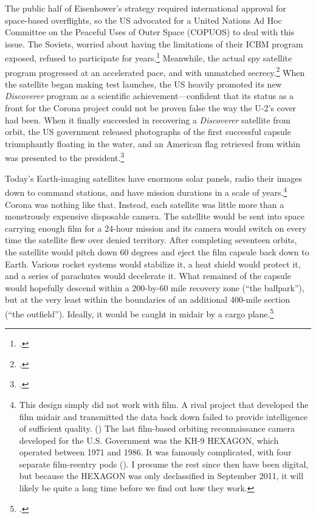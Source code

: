 \documentclass[14pt]{extarticle}
\begin{document}
The public half of Eisenhower's strategy required international approval for space-based overflights, so the US advocated for a United Nations Ad Hoc Committee on the Peaceful Uses of Outer Space (COPUOS) to deal with this issue. The Soviets, worried about having the limitations of their ICBM program exposed, refused to participate for years.\footcite[p.~140]{day_eye_2015} Meanwhile, the actual spy satellite program progressed at an accelerated pace, and with unmatched secrecy.\footcite[p.~51. The team started with only 30 personnel and eventually swelled to 300, almost none of whom knew the entire scope of the project. Team members had to take different routes to work to avoid being followed and were never allowed to say the word ``Corona'' on the telephone, or even the abbreviation ``C.'']{peebles_shadow_2000} When the satellite began making test launches, the US heavily promoted its new \emph{Discoverer} program as a scientific achievement---confident that its status as a front for the Corona project could not be proven false the way the U-2's cover had been. When it finally succeeded in recovering a \emph{Discoverer} satellite from orbit, the US government released photographs of the first successful capsule triumphantly floating in the water, and an American flag retrieved from within was presented to the president.\footcite[p.~83]{peebles_shadow_2000}

Today's Earth-imaging satellites have enormous solar panels, radio their images down to command stations, and have mission durations in a scale of years.\footnote{This design simply did not work with film. A rival project that developed the film midair and transmitted the data back down failed to provide intelligence of sufficient quality. (\cite[p.~203-204]{brugioni_eyes_2010}) The last film-based orbiting reconnaissance camera developed for the U.S. Government was the KH-9 HEXAGON, which operated between 1971 and 1986. It was famously complicated, with four separate film-reentry pods (\cite{pressel_spy_2013}). I presume the rest since then have been digital, but because the HEXAGON was only declassified in September 2011, it will likely be quite a long time before we find out how they work.} Corona was nothing like that. Instead, each satellite was little more than a monstrously expensive disposable camera. The satellite would be sent into space carrying enough film for a 24-hour mission and its camera would switch on every time the satellite flew over denied territory. After completing seventeen orbits, the satellite would pitch down 60 degrees and eject the film capsule back down to Earth. Various rocket systems would stabilize it, a heat shield would protect it, and a series of parachutes would decelerate it. What remained of the capsule would hopefully descend within a 200-by-60 mile recovery zone (``the ballpark''), but at the very least within the boundaries of an additional 400-mile section (``the outfield''). Ideally, it would be caught in midair by a cargo plane.\footcite[p.~56]{peebles_corona_1997}
\end{document}
